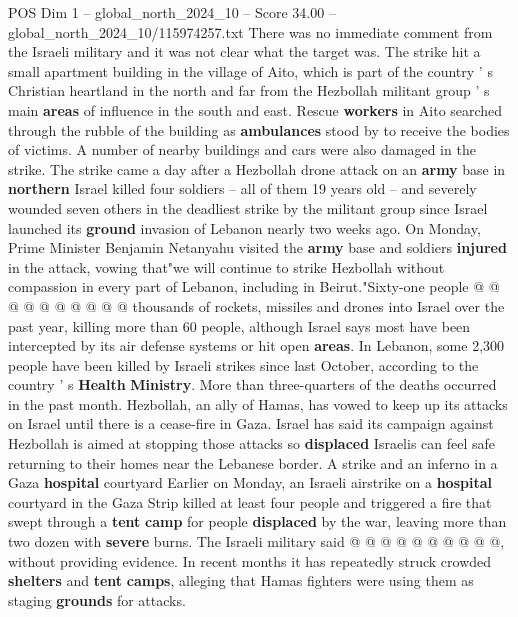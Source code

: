 \begin{textsample}{POS Dim 1 – global\_north\_2024\_10 – Score 34.00 – global\_north\_2024\_10/115974257.txt}  \label{ex:f1_pos_373}
There was no immediate comment from the Israeli military and it was not clear what the target was.
The strike hit a small apartment building in the village of Aito, which is part of the country ' s Christian heartland in the north and far from the Hezbollah militant group ' s main \textbf{areas} of influence in the south and east.
Rescue \textbf{workers} in Aito searched through the rubble of the building as \textbf{ambulances} stood by to receive the bodies of victims.
A number of nearby buildings and cars were also damaged in the strike.
The strike came a day after a Hezbollah drone attack on an \textbf{army} base in \textbf{northern} Israel killed four soldiers -- all of them 19 years old -- and severely wounded seven others in the deadliest strike by the militant group since Israel launched its \textbf{ground} invasion of Lebanon nearly two weeks ago.
On Monday, Prime Minister Benjamin Netanyahu visited the \textbf{army} base and soldiers \textbf{injured} in the attack, vowing that"we will continue to strike Hezbollah without compassion in every part of Lebanon, including in Beirut."Sixty-one people @ @ @ @ @ @ @ @ @ @ thousands of rockets, missiles and drones into Israel over the past year, killing more than 60 people, although Israel says most have been intercepted by its air defense systems or hit open \textbf{areas}.
In Lebanon, some 2,300 people have been killed by Israeli strikes since last October, according to the country ' s \textbf{Health} \textbf{Ministry}.
More than three-quarters of the deaths occurred in the past month.
Hezbollah, an ally of Hamas, has vowed to keep up its attacks on Israel until there is a cease-fire in Gaza.
Israel has said its campaign against Hezbollah is aimed at stopping those attacks so \textbf{displaced} Israelis can feel safe returning to their homes near the Lebanese border.
A strike and an inferno in a Gaza \textbf{hospital} courtyard Earlier on Monday, an Israeli airstrike on a \textbf{hospital} courtyard in the Gaza Strip killed at least four people and triggered a fire that swept through a \textbf{tent} \textbf{camp} for people \textbf{displaced} by the war, leaving more than two dozen with \textbf{severe} burns.
The Israeli military said @ @ @ @ @ @ @ @ @ @, without providing evidence.
In recent months it has repeatedly struck crowded \textbf{shelters} and \textbf{tent} \textbf{camps}, alleging that Hamas fighters were using them as staging \textbf{grounds} for attacks.

\end{textsample}
